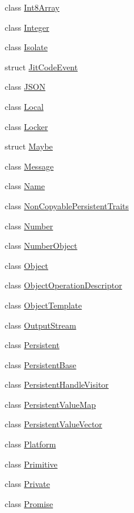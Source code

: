 \begin{DoxyCompactItemize}
class \hyperlink{classv8_1_1Int8Array}{Int8\+Array}
\item 
class \hyperlink{classv8_1_1Integer}{Integer}
\item 
class \hyperlink{classv8_1_1Isolate}{Isolate}
\item 
struct \hyperlink{structv8_1_1JitCodeEvent}{Jit\+Code\+Event}
\item 
class \hyperlink{classv8_1_1JSON}{J\+S\+O\+N}
\item 
class \hyperlink{classv8_1_1Local}{Local}
\item 
class \hyperlink{classv8_1_1Locker}{Locker}
\item 
struct \hyperlink{structv8_1_1Maybe}{Maybe}
\item 
class \hyperlink{classv8_1_1Message}{Message}
\item 
class \hyperlink{classv8_1_1Name}{Name}
\item 
class \hyperlink{classv8_1_1NonCopyablePersistentTraits}{Non\+Copyable\+Persistent\+Traits}
\item 
class \hyperlink{classv8_1_1Number}{Number}
\item 
class \hyperlink{classv8_1_1NumberObject}{Number\+Object}
\item 
class \hyperlink{classv8_1_1Object}{Object}
\item 
class \hyperlink{classv8_1_1ObjectOperationDescriptor}{Object\+Operation\+Descriptor}
\item 
class \hyperlink{classv8_1_1ObjectTemplate}{Object\+Template}
\item 
class \hyperlink{classv8_1_1OutputStream}{Output\+Stream}
\item 
class \hyperlink{classv8_1_1Persistent}{Persistent}
\item 
class \hyperlink{classv8_1_1PersistentBase}{Persistent\+Base}
\item 
class \hyperlink{classv8_1_1PersistentHandleVisitor}{Persistent\+Handle\+Visitor}
\item 
class \hyperlink{classv8_1_1PersistentValueMap}{Persistent\+Value\+Map}
\item 
class \hyperlink{classv8_1_1PersistentValueVector}{Persistent\+Value\+Vector}
\item 
class \hyperlink{classv8_1_1Platform}{Platform}
\item 
class \hyperlink{classv8_1_1Primitive}{Primitive}
\item 
class \hyperlink{classv8_1_1Private}{Private}
\item 
class \hyperlink{classv8_1_1Promise}{Promise}

\end{DoxyCompactItemize}
